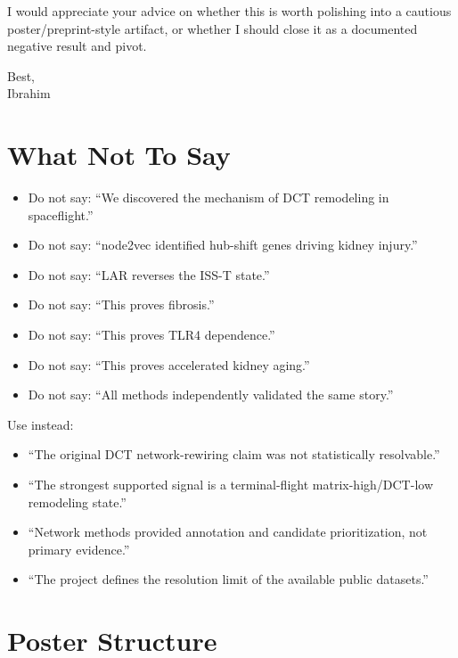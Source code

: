 \documentclass[11pt]{article}
\begin{document}
I would appreciate your advice on whether this is worth polishing into a cautious poster/preprint-style artifact, or whether I should close it as a documented negative result and pivot.

Best,\\
Ibrahim

\section*{What Not To Say}

\begin{itemize}
  \item Do not say: ``We discovered the mechanism of DCT remodeling in spaceflight.''
  \item Do not say: ``node2vec identified hub-shift genes driving kidney injury.''
  \item Do not say: ``LAR reverses the ISS-T state.''
  \item Do not say: ``This proves fibrosis.''
  \item Do not say: ``This proves TLR4 dependence.''
  \item Do not say: ``This proves accelerated kidney aging.''
  \item Do not say: ``All methods independently validated the same story.''
\end{itemize}

Use instead:

\begin{itemize}
  \item ``The original DCT network-rewiring claim was not statistically resolvable.''
  \item ``The strongest supported signal is a terminal-flight matrix-high/DCT-low remodeling state.''
  \item ``Network methods provided annotation and candidate prioritization, not primary evidence.''
  \item ``The project defines the resolution limit of the available public datasets.''
\end{itemize}

\section*{Poster Structure}
\end{document}
